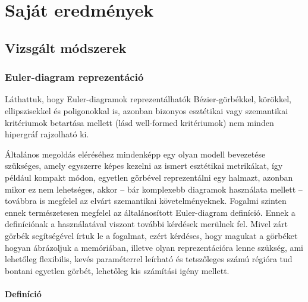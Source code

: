 

\cleardoublepage
\chapter{Saját eredmények}
\section{Vizsgált módszerek}

\subsection{Euler-diagram reprezentáció}

Láthattuk, hogy Euler-diagramok reprezentálhatók Bézier-görbékkel, körökkel, ellipszisekkel és poligonokkal is, azonban bizonyos esztétikai vagy szemantikai kritériumok betartása mellett (lásd well-formed kritériumok) nem minden hipergráf rajzolható ki.

Általános megoldás eléréséhez mindenképp egy olyan modell bevezetése szükséges, amely egyszerre képes kezelni az ismert esztétikai metrikákat, így például kompakt módon, egyetlen görbével reprezentálni egy halmazt, azonban mikor ez nem lehetséges, akkor -- bár komplexebb diagramok használata mellett -- továbbra is megfelel az elvárt szemantikai követelményeknek. Fogalmi szinten ennek természetesen megfelel az általánosított Euler-diagram definíció. Ennek a definíciónak a használatával viszont további kérdések merülnek fel. Mivel zárt görbék segítségével írtuk le a fogalmat, ezért kérdéses, hogy magukat a görbéket hogyan ábrázoljuk a memóriában, illetve olyan reprezentációra lenne szükség, ami lehetőleg flexibilis, kevés paraméterrel leírható és tetszőleges számú régióra tud bontani egyetlen görbét, lehetőleg kis számítási igény mellett.

\subsubsection{Definíció} \label{eulerSolution}


